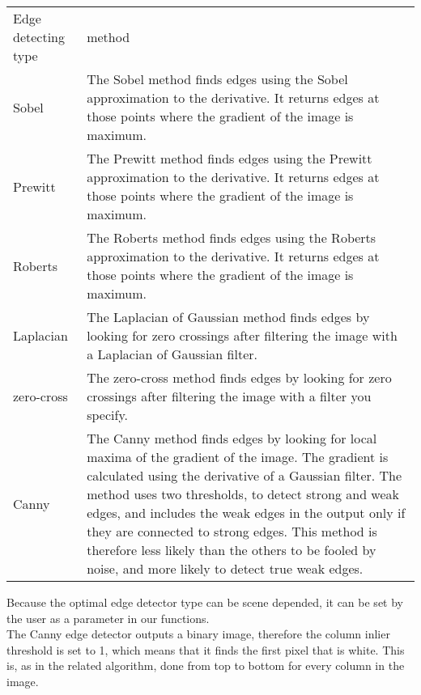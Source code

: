 

\begin{table}[ht]
\begin{tabular}{|l|p{10cm}|}
	\hline
	Edge detecting type		& method\\
	Sobel					& The Sobel method finds edges using the Sobel
	approximation to the derivative. It returns edges at those points where the
	gradient of the image is maximum.\\
	\hline
	Prewitt					& The Prewitt method finds edges using the Prewitt
	approximation to the derivative. It returns edges at those points where the
	gradient of the image is maximum.\\
	\hline
	Roberts					& The Roberts method finds edges using the Roberts
	approximation to the derivative. It returns edges at those points where the
	gradient of the image is maximum.\\
	\hline
	Laplacian				& The Laplacian of Gaussian method finds edges by
	looking for zero crossings after filtering the image with a Laplacian of Gaussian
	filter.\\
	\hline
	zero-cross				& The zero-cross method finds edges by looking for zero
	crossings after filtering the image with a filter you specify.\\
	\hline
	Canny					& The Canny method finds edges by looking for local
	maxima of the gradient of the image. The gradient is calculated using the derivative of
	a Gaussian filter. The method uses two thresholds, to detect strong and weak
	edges, and includes the weak edges in the output only if they are connected to
	strong edges. This method is therefore less likely than the others to be fooled
	by noise, and more likely to detect true weak edges.\\
	\hline
\end{tabular}
\end{table}

Because the optimal edge detector type can be scene depended, it can be set
by the user as a parameter in our functions.\\

The Canny edge detector outputs a binary image, therefore the column inlier
threshold is set to 1, which means that it finds the first pixel that is white. 
This is, as in the related algorithm, done from top to bottom for every column in
the image.\\

